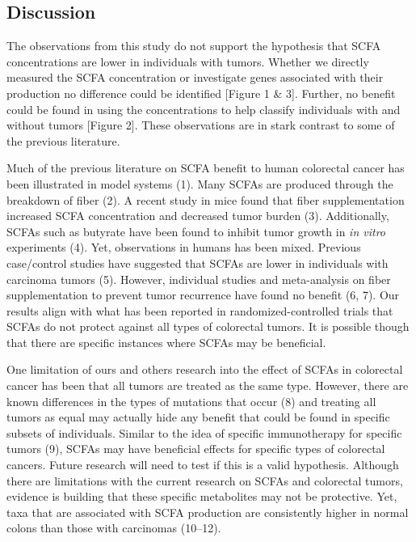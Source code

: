 \documentclass[11pt,]{article}
\begin{document}
\newpage

\subsection{Discussion}\label{discussion}

The observations from this study do not support the hypothesis that SCFA
concentrations are lower in individuals with tumors. Whether we directly
measured the SCFA concentration or investigate genes associated with
their production no difference could be identified {[}Figure 1 \& 3{]}.
Further, no benefit could be found in using the concentrations to help
classify individuals with and without tumors {[}Figure 2{]}. These
observations are in stark contrast to some of the previous literature.

Much of the previous literature on SCFA benefit to human colorectal
cancer has been illustrated in model systems (1). Many SCFAs are
produced through the breakdown of fiber (2). A recent study in mice
found that fiber supplementation increased SCFA concentration and
decreased tumor burden (3). Additionally, SCFAs such as butyrate have
been found to inhibit tumor growth in \emph{in vitro} experiments (4).
Yet, observations in humans has been mixed. Previous case/control
studies have suggested that SCFAs are lower in individuals with
carcinoma tumors (5). However, individual studies and meta-analysis on
fiber supplementation to prevent tumor recurrence have found no benefit
(6, 7). Our results align with what has been reported in
randomized-controlled trials that SCFAs do not protect against all types
of colorectal tumors. It is possible though that there are specific
instances where SCFAs may be beneficial.

One limitation of ours and others research into the effect of SCFAs in
colorectal cancer has been that all tumors are treated as the same type.
However, there are known differences in the types of mutations that
occur (8) and treating all tumors as equal may actually hide any benefit
that could be found in specific subsets of individuals. Similar to the
idea of specific immunotherapy for specific tumors (9), SCFAs may have
beneficial effects for specific types of colorectal cancers. Future
research will need to test if this is a valid hypothesis. Although there
are limitations with the current research on SCFAs and colorectal
tumors, evidence is building that these specific metabolites may not be
protective. Yet, taxa that are associated with SCFA production are
consistently higher in normal colons than those with carcinomas
(10--12).
\end{document}

